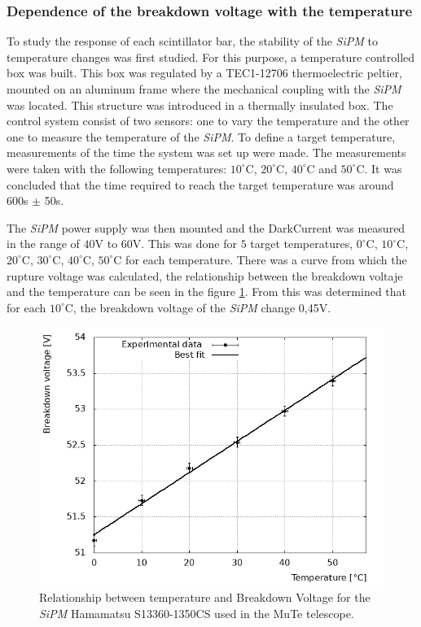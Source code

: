 \documentclass[submitting]{nst}
\begin{document}
\subsubsection{Dependence of the breakdown voltage with the temperature}%

To study the response of each scintillator bar, the stability of the \textsl{SiPM} to temperature changes was first studied. For this purpose, a temperature controlled box was built. This box was regulated by a TEC1-12706 thermoelectric peltier, mounted on an aluminum frame where the mechanical coupling with the \textsl{SiPM} was located. 
This structure was introduced in a thermally insulated box. The control system consist of two sensors: one to vary the temperature and the other one to measure the temperature of the \textsl{SiPM}. To define a target temperature, measurements of the time the system was set up were made. The measurements were taken with the following temperatures: $10^{\circ}$C, $20^{\circ}$C,  $40^{\circ}$C and $50^{\circ}$C. It was concluded that the time required to reach the target temperature was around 600s $\pm$ 50s.

The \textsl{SiPM} power supply was then mounted and the DarkCurrent \cite{Renker2006} was measured in the range of $40$V to $60$V. This was done for $5$ target temperatures, $0^{\circ}$C, $10^{\circ}$C, $20^{\circ}$C, $30^{\circ}$C, $40^{\circ}$C, $50^{\circ}$C for each temperature. There was a curve from which the rupture voltage was calculated, the relationship between the breakdown voltaje and the temperature can be seen in the figure \ref{temperature}. From this was determined that for each $10^{\circ}$C,  the breakdown voltage of the \textsl{SiPM} change 0,45V.

\begin{figure}[h!] %
    \centering
        \includegraphics[scale=0.49]{Figures/voltajeRuptura.png}
   \caption{Relationship between temperature and Breakdown Voltage for the  \textsl{SiPM} Hamamatsu S13360-1350CS used in the MuTe telescope.}\label{temperature}
\end{figure}
\end{document}
